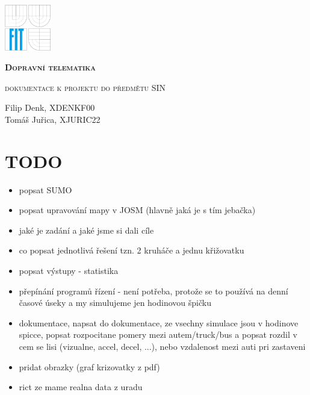\documentclass[a4paper,11pt]{article}
\begin{document}
\begin{titlepage}
	\centering
	\includegraphics[width=0.15\textwidth]{fig/fit-zp2.pdf}\par\vspace{7cm}
	{\scshape\LARGE\bfseries Dopravní telematika\par}
	\vspace{0.5cm}
	{\scshape\Large dokumentace k projektu do předmětu SIN \par}
	\vspace{1.5cm}
	{\huge\bfseries \par}
	\vspace{2cm}
	{\Large\itshape \par}
	\vspace{8cm}
	Filip Denk, XDENKF00
	\\Tomáš Juřica, XJURIC22
\end{titlepage}


\section{TODO}
\begin{itemize}
	\item popsat SUMO
	\item popsat upravování mapy v JOSM (hlavně jaká je s tím jebačka)
	\item jaké je zadání a jaké jsme si dali cíle
	\item co popsat jednotlivá řešení tzn. 2 kruháče a jednu křižovatku
	\item popsat výstupy - statistika
	\item přepínání programů řízení - není potřeba, protože se to používá na denní časové úseky a my simulujeme jen hodinovou špičku
	\item dokumentace, napsat do dokumentace, ze vsechny simulace jsou v hodinove spicce, popsat rozpocitane pomery mezi autem/truck/bus a popsat rozdil v cem se lisi (vizualne, accel, decel, ...), nebo vzdalenost mezi auti pri zastaveni
	\item pridat obrazky (graf krizovatky z pdf)
	\item rict ze mame realna data z uradu
\end{itemize}
\end{document}
